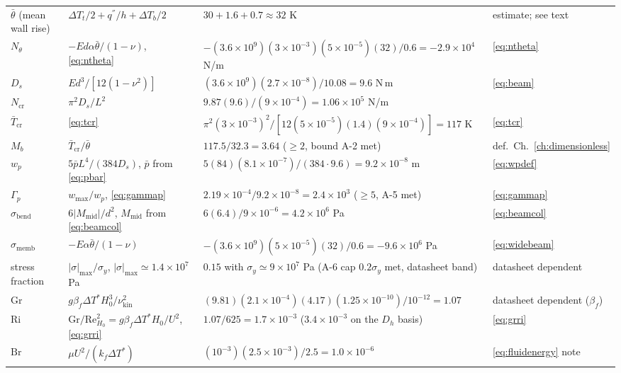\begin{longtable}{p{3.0cm}p{3.4cm}p{4.2cm}p{2.6cm}}
$\bar\theta$ (mean wall rise) & $\Delta T_t/2+q^{''}/h+\Delta T_b/2$ & $30+1.6+0.7\approx32$ K & estimate; see text \\
$N_\theta$ & $-Ed\alpha\bar\theta/(1-\nu)$, \eqref{eq:ntheta} & $-(3.6\times10^9)(3\times10^{-3})(5\times10^{-5})(32)/0.6=-2.9\times10^4$ N/m & \eqref{eq:ntheta} \\
$D_s$ & $Ed^3/[12(1-\nu^2)]$ & $(3.6\times10^9)(2.7\times10^{-8})/10.08=9.6$ N\,m & \eqref{eq:beam} \\
$N_{\mathrm{cr}}$ & $\pi^2D_s/L^2$ & $9.87(9.6)/(9\times10^{-4})=1.06\times10^5$ N/m & \cite{timoshenko1961stability} \\
$\bar T_{\mathrm{cr}}$ & \eqref{eq:tcr} & $\pi^2(3\times10^{-3})^2/[12(5\times10^{-5})(1.4)(9\times10^{-4})]=117$ K & \eqref{eq:tcr} \\
$M_b$ & $\bar T_{\mathrm{cr}}/\bar\theta$ & $117.5/32.3=3.64$ ($\ge2$, bound A-2 met) & def.\ Ch.~\ref{ch:dimensionless} \\
$w_p$ & $5\bar pL^4/(384D_s)$, $\bar p$ from \eqref{eq:pbar} & $5(84)(8.1\times10^{-7})/(384\cdot9.6)=9.2\times10^{-8}$ m & \eqref{eq:wpdef} \\
$\Gamma_p$ & $w_{\max}/w_p$, \eqref{eq:gammap} & $2.19\times10^{-4}/9.2\times10^{-8}=2.4\times10^{3}$ ($\ge5$, A-5 met) & \eqref{eq:gammap} \\
$\sigma_{\mathrm{bend}}$ & $6|M_{\mathrm{mid}}|/d^2$, $M_{\mathrm{mid}}$ from \eqref{eq:beamcol} & $6(6.4)/9\times10^{-6}=4.2\times10^{6}$ Pa & \eqref{eq:beamcol} \\
$\sigma_{\mathrm{memb}}$ & $-E\alpha\bar\theta/(1-\nu)$ & $-(3.6\times10^9)(5\times10^{-5})(32)/0.6=-9.6\times10^{6}$ Pa & \eqref{eq:widebeam} \\
stress fraction & $|\sigma|_{\max}/\sigma_y$, $|\sigma|_{\max}\simeq1.4\times10^{7}$ Pa & $0.15$ with $\sigma_y\simeq9\times10^7$ Pa (A-6 cap $0.2\sigma_y$ met, datasheet band) & datasheet dependent \\
$\mathrm{Gr}$ & $g\beta_f\Delta T^*H_0^3/\nu_{\mathrm{kin}}^2$ & $(9.81)(2.1\times10^{-4})(4.17)(1.25\times10^{-10})/10^{-12}=1.07$ & datasheet dependent ($\beta_f$) \\
$\mathrm{Ri}$ & $\mathrm{Gr}/\mathrm{Re}_{H_0}^2=g\beta_f\Delta T^*H_0/U^2$, \eqref{eq:grri} & $1.07/625=1.7\times10^{-3}$ ($3.4\times10^{-3}$ on the $D_h$ basis) & \eqref{eq:grri} \\
$\mathrm{Br}$ & $\mu U^2/(k_f\Delta T^*)$ & $(10^{-3})(2.5\times10^{-3})/2.5=1.0\times10^{-6}$ & \eqref{eq:fluidenergy} note \\

\end{longtable}
